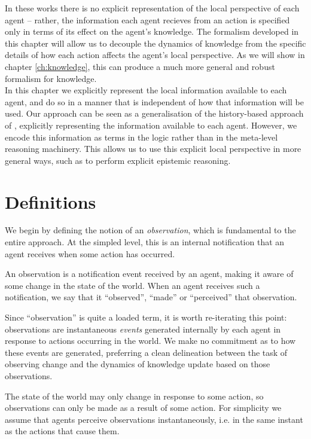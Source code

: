 In these works there is no explicit representation of the local perspective
of each agent -- rather, the information each agent recieves from
an action is specified only in terms of its effect on the agent's
knowledge. The formalism developed in this chapter will allow us to
decouple the dynamics of knowledge from the specific details of how
each action affects the agent's local perspective. As we will show
in chapter \ref{ch:knowledge}, this can produce a much more general
and robust formalism for knowledge.\\


In this chapter we explicitly represent the local information available
to each agent, and do so in a manner that is independent of how that
information will be used. Our approach can be seen as a generalisation
of the history-based approach of \citep{giacomo99indigolog}, explicitly
representing the information available to each agent. However, we
encode this information as terms in the logic rather than in the meta-level
reasoning machinery. This allows us to use this explicit local perspective
in more general ways, such as to perform explicit epistemic reasoning.


\section{Definitions\label{sec:Observations:Definitions}}

We begin by defining the notion of an \emph{observation}, which is
fundamental to the entire approach\emph{.} At the simpled level, this
is an internal notification that an agent receives when some action
has occurred.

\begin{defnL}
[{Observations}] An observation is a notification event received
by an agent, making it aware of some change in the state of the world.
When an agent receives such a notification, we say that it {}``observed'',
{}``made'' or {}``perceived'' that observation. 
\end{defnL}
Since {}``observation'' is quite a loaded term, it is worth re-iterating
this point: observations are instantaneous \emph{events} generated
internally by each agent in response to actions occurring in the world.
We make no commitment as to how these events are generated, preferring
a clean delineation between the task of observing change and the dynamics
of knowledge update based on those observations.

The state of the world may only change in response to some action,
so observations can only be made as a result of some action. For simplicity
we assume that agents perceive observations instantaneously, i.e.
in the same instant as the actions that cause them.


